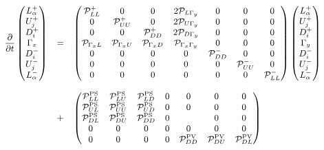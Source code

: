 \documentclass[10pt,a4paper]{article}
\begin{document}
\begin{equation}
\small
\begin{array}{rcl}
\displaystyle 
\frac{\partial}{\partial t}
\begin{pmatrix}
L_\alpha^+\\
U_j^+ \\
D_i^+\\
\Gamma_x\\
D_i^-\\
U_j^-\\
L_\alpha^-
\end{pmatrix} &=&
\displaystyle 
\begin{pmatrix}
\mathcal{P}_{LL}^+ & 0 & 0 & 2\mathcal{P}_{L\Gamma_y} & 0 & 0 & 0 \\ 
0 & \mathcal{P}_{UU}^+ & 0 & 2\mathcal{P}_{U\Gamma_y} & 0 & 0 & 0 \\ 
0 & 0 & \mathcal{P}_{DD}^+ & 2\mathcal{P}_{D\Gamma_y} & 0 & 0 & 0 \\ 
\mathcal{P}_{\Gamma_x L} & \mathcal{P}_{\Gamma_x U} & \mathcal{P}_{\Gamma_x D} & \mathcal{P}_{\Gamma_x\Gamma_y} & 0 & 0 & 0\\
0 & 0 & 0 & 0 & \mathcal{P}_{DD}^- & 0 & 0\\
0 & 0 & 0 & 0 & 0 & \mathcal{P}_{UU}^- & 0\\
0 & 0 & 0 & 0 & 0 & 0 & \mathcal{P}_{LL}^-
\end{pmatrix}
\begin{pmatrix}
L_\alpha^+\\
U_j^+\\
D_i^+\\
\Gamma_y\\
D_i^-\\
U_j^-\\
L_\alpha^-
\end{pmatrix}\\
\\
&+&
\displaystyle 
\begin{pmatrix}
\mathcal{P}^{\rm PS}_{LL} & \mathcal{P}^{\rm PS}_{LU} & \mathcal{P}^{\rm PS}_{LD}& 0 &0 &0 & 0\\ 
\mathcal{P}^{\rm PS}_{UL} & \mathcal{P}^{\rm PS}_{UU} & \mathcal{P}^{\rm PS}_{UD} & 0 &0 &0 &0 \\ 
\mathcal{P}^{\rm PS}_{DL} & \mathcal{P}^{\rm PS}_{DU} & \mathcal{P}^{\rm PS}_{DD} & 0 & &0 &0 \\ 
0 & 0 & 0 & 0 & 0 & 0 & 0\\
0& 0&0 & 0 & \mathcal{P}^{\rm PV}_{DD} & \mathcal{P}^{\rm PV}_{DU} & \mathcal{P}^{\rm PV}_{DL}\\

\end{pmatrix}
\end{array}
\end{equation}
\end{document}
